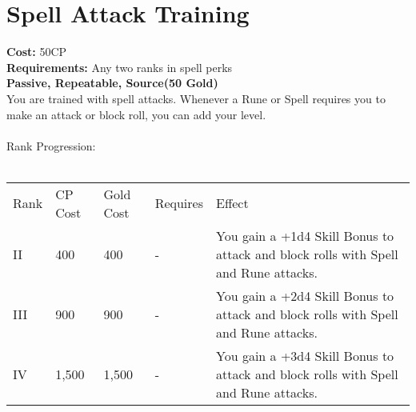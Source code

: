 \section{Spell Attack Training}\label{perk:spellAttackTraining}
\textbf{Cost:} 50CP\\
\textbf{Requirements:} Any two ranks in spell perks\\
\textbf{Passive, Repeatable, Source(50 Gold)}\\
You are trained with spell attacks.
Whenever a Rune or Spell requires you to make an attack or block roll, you can add your level.\\
\\
Rank Progression:\\
\\
\begin{longtable}{l | l | l | l | p{9cm}}
	Rank & CP Cost & Gold Cost & Requires & Effect\\
	II & 400 & 400 & - & You gain a +1d4 Skill Bonus to attack and block rolls with Spell and Rune attacks.\\
	III & 900 & 900 & - & You gain a +2d4 Skill Bonus to attack and block rolls with Spell and Rune attacks.\\
	IV & 1,500 & 1,500 & - & You gain a +3d4 Skill Bonus to attack and block rolls with Spell and Rune attacks.\\
\end{longtable}
